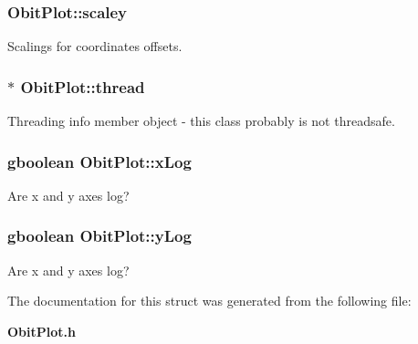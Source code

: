 \subsubsection{ {\bf Obit\-Plot::scaley}}\label{structObitPlot_o11}


Scalings for coordinates offsets. 

\subsubsection{$\ast$ {\bf Obit\-Plot::thread}}\label{structObitPlot_o4}


Threading info member object - this class probably is not threadsafe. 

\subsubsection{\setlength{\rightskip}{0pt plus 5cm}gboolean {\bf Obit\-Plot::x\-Log}}\label{structObitPlot_o8}


Are x and y axes log? 

\subsubsection{\setlength{\rightskip}{0pt plus 5cm}gboolean {\bf Obit\-Plot::y\-Log}}\label{structObitPlot_o9}


Are x and y axes log? 



The documentation for this struct was generated from the following file:\begin{CompactItemize}
\item 
{\bf Obit\-Plot.h}\end{CompactItemize}
